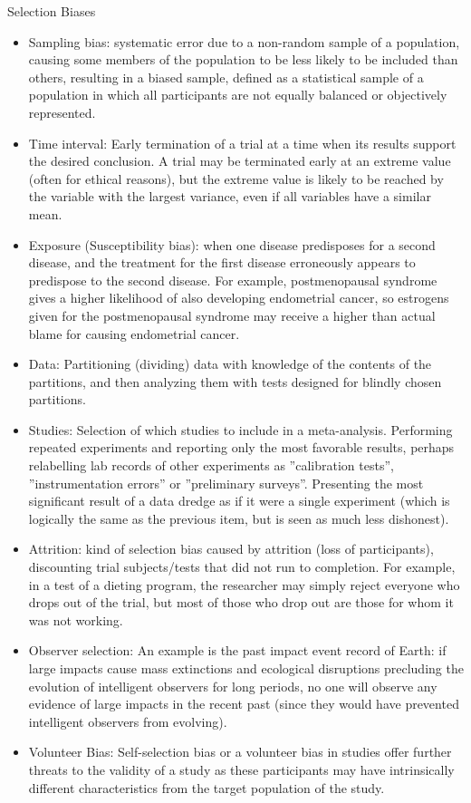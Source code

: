 \documentclass[asd-beamer.tex]{subfiles}%
\begin{document}
\begin{frame}[allowframebreaks]{Selection Biases}
    \begin{itemize}
        \item Sampling bias: systematic error due to a non-random sample of a population, causing some members of the population to be less likely to be included than others, resulting in a biased sample, defined as a statistical sample of a population in which all participants are not equally balanced or objectively represented.
\item Time interval: Early termination of a trial at a time when its results support the desired conclusion.
    A trial may be terminated early at an extreme value (often for ethical reasons), but the extreme value is likely to be reached by the variable with the largest variance, even if all variables have a similar mean.
\item Exposure (Susceptibility bias): when one disease predisposes for a second disease, and the treatment for the first disease erroneously appears to predispose to the second disease. For example, postmenopausal syndrome gives a higher likelihood of also developing endometrial cancer, so estrogens given for the postmenopausal syndrome may receive a higher than actual blame for causing endometrial cancer.
\item Data: Partitioning (dividing) data with knowledge of the contents of the partitions, and then analyzing them with tests designed for blindly chosen partitions.
\item Studies: Selection of which studies to include in a meta-analysis. Performing repeated experiments and reporting only the most favorable results, perhaps relabelling lab records of other experiments as ''calibration tests'', ''instrumentation errors'' or ''preliminary surveys''.
    Presenting the most significant result of a data dredge as if it were a single experiment (which is logically the same as the previous item, but is seen as much less dishonest).
\item Attrition: kind of selection bias caused by attrition (loss of participants), discounting trial subjects/tests that did not run to completion. For example, in a test of a dieting program, the researcher may simply reject everyone who drops out of the trial, but most of those who drop out are those for whom it was not working.
\item Observer selection: An example is the past impact event record of Earth: if large impacts cause mass extinctions and ecological disruptions precluding the evolution of intelligent observers for long periods, no one will observe any evidence of large impacts in the recent past (since they would have prevented intelligent observers from evolving).
\item Volunteer Bias: Self-selection bias or a volunteer bias in studies offer further threats to the validity of a study as these participants may have intrinsically different characteristics from the target population of the study.
    \end{itemize}
\end{frame}
\end{document}
